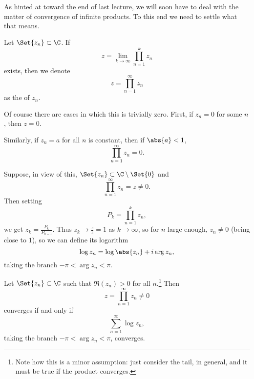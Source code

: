 


As hinted at toward the end of last lecture, we will soon have to deal with the matter of convergence of infinite products.
To this end we need to settle what that means.

\begin{definition}
	Let $\Set{z_n} \subset \C$.
	If
	\[
		z = \lim_{k \to \infty} \prod_{n = 1}^k z_n
	\]
	exists, then we denote
	\[
		z = \prod_{n = 1}^\infty z_n
	\]
	as the  of $z_n$.
\end{definition}

\begin{remark}
	Of course there are cases in which this is trivially zero.
	First, if $z_n = 0$ for some $n$, then $z = 0$.

	Similarly, if $z_n = a$ for all $n$ is constant, then if $\abs{a} < 1$,
	\[
		\prod_{n = 1}^\infty z_n = 0.
	\]
\end{remark}

Suppose, in view of this, $\Set{z_n} \subset \C \setminus \Set{0}$ and
\[
	\prod_{n = 1}^\infty z_n = z \neq 0.
\]
Then setting
\[
	P_k = \prod_{n = 1}^k z_n,
\]
we get $z_k = \frac{P_k}{P_{k - 1}}$.
Thus $z_k \to \frac{z}{z} = 1$ as $k \to \infty$, so for $n$ large enough, $z_n \neq 0$ (being close to $1$), so we can define its logarithm
\[
	\log z_n = \log\abs{z_n} + i \arg z_n,
\]
taking the branch $-\pi < \arg z_n < \pi$.

\begin{proposition}\label{prop8.1}
	Let $\Set{z_n} \subset \C$ such that $\Re(z_n) > 0$ for all $n$.\footnote{Note how this is a minor assumption: just consider the tail, in general, and it must be true if the product converges.}
	Then
	\[
		z = \prod_{n = 1}^\infty z_n \neq 0
	\]
	converges if and only if
	\[
		\sum_{n = 1}^\infty \log z_n,
	\]
	taking the branch $-\pi < \arg z_n < \pi$, converges.
\end{proposition}

